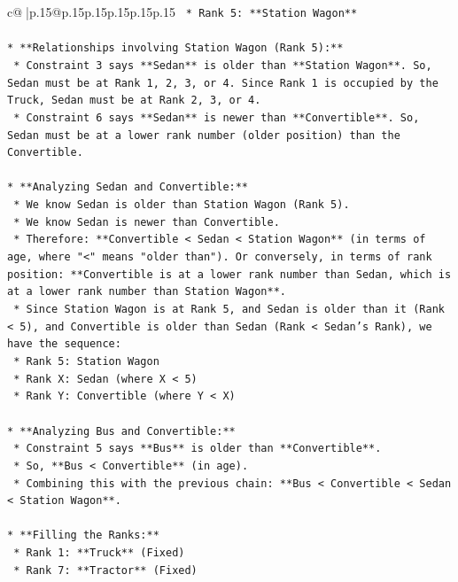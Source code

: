 \documentclass{article}
\begin{document}
{\begin{supertabular}{c@{$\;$}|p{.15\linewidth}@{}p{.15\linewidth}p{.15\linewidth}p{.15\linewidth}p{.15\linewidth}p{.15\linewidth}}
{{{\texttt{    *   Rank 5: **Station Wagon**} \\
\\ 
\texttt{*   **Relationships involving Station Wagon (Rank 5):**} \\
\texttt{    *   Constraint 3 says **Sedan** is older than **Station Wagon**. So, Sedan must be at Rank 1, 2, 3, or 4. Since Rank 1 is occupied by the Truck, Sedan must be at Rank 2, 3, or 4.} \\
\texttt{    *   Constraint 6 says **Sedan** is newer than **Convertible**. So, Sedan must be at a lower rank number (older position) than the Convertible.} \\
\\ 
\texttt{*   **Analyzing Sedan and Convertible:**} \\
\texttt{    *   We know Sedan is older than Station Wagon (Rank 5).} \\
\texttt{    *   We know Sedan is newer than Convertible.} \\
\texttt{    *   Therefore: **Convertible < Sedan < Station Wagon** (in terms of age, where "<" means "older than"). Or conversely, in terms of rank position: **Convertible is at a lower rank number than Sedan, which is at a lower rank number than Station Wagon**.} \\
\texttt{    *   Since Station Wagon is at Rank 5, and Sedan is older than it (Rank < 5), and Convertible is older than Sedan (Rank < Sedan's Rank), we have the sequence:} \\
\texttt{        *   Rank 5: Station Wagon} \\
\texttt{        *   Rank X: Sedan (where X < 5)} \\
\texttt{        *   Rank Y: Convertible (where Y < X)} \\
\\ 
\texttt{*   **Analyzing Bus and Convertible:**} \\
\texttt{    *   Constraint 5 says **Bus** is older than **Convertible**.} \\
\texttt{    *   So, **Bus < Convertible** (in age).} \\
\texttt{    *   Combining this with the previous chain: **Bus < Convertible < Sedan < Station Wagon**.} \\
\\ 
\texttt{*   **Filling the Ranks:**} \\
\texttt{    *   Rank 1: **Truck** (Fixed)} \\
\texttt{    *   Rank 7: **Tractor** (Fixed)} \\
}}}
\end{supertabular}}
\end{document}
